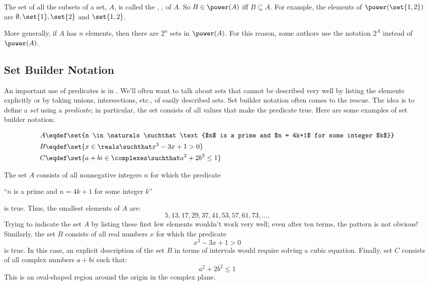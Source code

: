 The set of all the subsets of a set, $A$, is called the , , of $A$.  So $B \in \power(A)$ iff $B
\subseteq A$.  For example, the elements of $\power(\set{1, 2})$ are
$\emptyset, \set{1}, \set{2}$ and $\set{1, 2}$.

More generally, if $A$ has $n$ elements, then there are $2^n$ sets in
$\power(A)$.  For this reason, some authors use the notation $2^A$ instead
of $\power(A)$.

\subsection{Set Builder Notation}

An important use of predicates is in .  We'll
often want to talk about sets that cannot be described very well by
listing the elements explicitly or by taking unions, intersections,
etc., of easily described sets.  Set builder notation often comes to the
rescue.  The idea is to define a \textit{set} using a \textit{predicate};
in particular, the set consists of all values that make the predicate
true.  Here are some examples of set builder notation:

\begin{align*}
A & \eqdef \set{n \in \naturals \suchthat \text{$n$ is a prime and $n =
    4k+1$ for some integer $k$}} \\
B & \eqdef \set{x \in \reals \suchthat x^3 - 3 x + 1 > 0} \\
C & \eqdef \set{a + b i \in \complexes \suchthat a^2 + 2 b^2 \leq 1}
\end{align*}

The set $A$ consists of all nonnegative integers $n$ for which the
predicate
\begin{center}
``$n$ is a prime and $n = 4k+1$ for some integer $k$''
\end{center}
is true.  Thus, the smallest elements of $A$ are:
\[
5, 13, 17, 29, 37, 41, 53, 57, 61, 73, \ldots.
\]
Trying to indicate the set $A$ by listing these first few elements
wouldn't work very well; even after ten terms, the pattern is not
obvious!  Similarly, the set $B$ consists of all real numbers $x$ for
which the predicate
\[
x^3 - 3x + 1 > 0
\]
is true.  In this case, an explicit description of the set $B$ in
terms of intervals would require solving a cubic equation.  Finally,
set $C$ consists of all complex numbers $a + b i$ such that:
\[
a^2 + 2 b^2 \leq 1
\]
This is an oval-shaped region around the origin in the complex plane.

